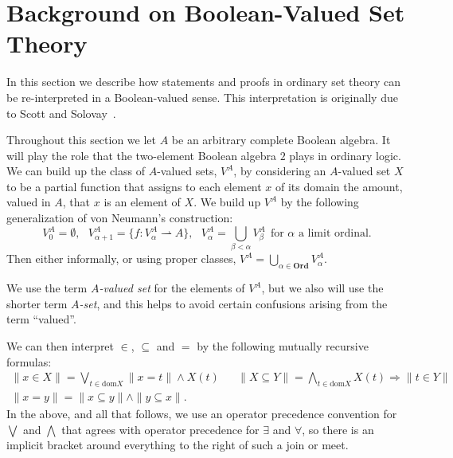 \documentclass{lmcs}
\newcommand{\blank}{\ensuremath{{\mbox{-}}}}
\newcommand{\dom}{\ensuremath{\mathrm{dom}}}
\newcommand{\cat}[1]{\ensuremath{\mathbf{#1}}}
\newcommand{\Ord}{\cat{Ord}}
\newcommand{\parfun}{\rightharpoonup}
\begin{document}
\section{Background on Boolean-Valued Set Theory}
\label{FirstOrderSection}
In this section we describe how statements and proofs in ordinary set theory can
be re-interpreted in a Boolean-valued sense. This interpretation is originally
due to Scott and Solovay~\cite{Scott67,jech,bell}. %

Throughout this section we let $A$ be an arbitrary complete Boolean algebra. It will play the role that the two-element Boolean algebra $2$ plays in ordinary logic. We can build up the class of $A$-valued sets, $V^A$, by considering an $A$-valued set $X$ to be a partial function that assigns to each element $x$ of its domain the amount, valued in $A$, that $x$ is an element of $X$. We build up $V^A$ by the following generalization of von Neumann's construction:
$$	V^A_0 = \emptyset,~~~V^A_{\alpha+1} = \{ f : V^A_\alpha \parfun A \},~~~
	V^A_{\alpha} = \bigcup_{\beta < \alpha}V^A_\beta ~~ \text{for } \alpha \text{ a limit ordinal.}
$$
Then either informally, or using proper classes, $V^A = \bigcup\limits_{\alpha \in \Ord} V^A_\alpha$.

We use the term \emph{$A$-valued set} for the elements of $V^A$, but we also will use the shorter term \emph{$A$-set}, and this helps to avoid certain confusions arising from the term ``valued''. 

We can then interpret $\in$, $\subseteq$ and $=$ by the following mutually recursive formulas: %
\begin{align*}
	\|x \in X\| = \bigvee_{t \in \dom X} \|x = t\| \land X(t) &&
	\|X \subseteq Y \| = \bigwedge_{t \in \dom X} X(t) \Rightarrow \|t \in Y\| \\
	\|x = y\| = \|x \subseteq y\| \land \|y \subseteq x\|.
\end{align*}
In the above, and all that follows, we use an operator precedence convention for $\bigvee$ and $\bigwedge$ that agrees with operator precedence for $\exists$ and $\forall$, so there is an implicit bracket around everything to the right of such a join or meet.
\end{document}

